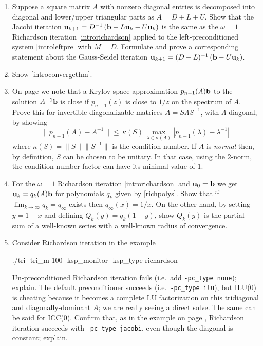 \renewcommand{\labelenumi}{\arabic{chapter}.\arabic{enumi}\quad}
\begin{enumerate}
\item Suppose a square matrix $A$ with nonzero diagonal entries is decomposed into diagonal and lower/upper triangular parts as $A=D+L+U$.  Show that the Jacobi iteration $\mathbf{u}_{k+1} = D^{-1} \left(\mathbf{b} - L \mathbf{u}_k - U \mathbf{u}_k\right)$ is the same as the $\omega=1$ Richardson iteration \eqref{introrichardson} applied to the left-preconditioned system \eqref{introleftpre} with $M=D$.  Formulate and prove a corresponding statement about the Gauss-Seidel iteration $\mathbf{u}_{k+1} = (D+L)^{-1} \left(\mathbf{b} - U \mathbf{u}_k\right)$.

\item Show \eqref{introconvergethm}.

\item On page \pageref{krylovgoal} we note that a Krylov space approximation $p_{n-1}(A)\mathbf{b}$ to the solution $A^{-1}\mathbf{b}$ is close if $p_{n-1}(z)$ is close to $1/z$ on the spectrum of $A$.  Prove this for invertible diagonalizable matrices $A=S\Lambda S^{-1}$, with $\Lambda$ diagonal, by showing
	$$\|p_{n-1}(A) - A^{-1}\| \le \,\kappa(S)\, \max_{\lambda \in \sigma(A)} |p_{n-1}(\lambda) - \lambda^{-1}|$$
where $\kappa(S) = \|S\| \|S^{-1}\|$ is the condition number.  If $A$ is \emph{normal} then, by definition, $S$ can be chosen to be unitary.  In that case, using the $2$-norm, the condition number factor can have its minimal value of $1$.

\item For the $\omega=1$ Richardson iteration \eqref{introrichardson} and $\mathbf{u}_0=\mathbf{b}$ we get $\mathbf{u}_k = q_k(A) \mathbf{b}$ for polynomials $q_k$ given by \eqref{richpolys}.  Show that if $\lim_{k\to\infty} q_k=q_\infty$ exists then $q_\infty(x)=1/x$.  On the other hand, by setting $y=1-x$ and defining $Q_k(y)=q_k(1-y)$, show $Q_k(y)$ is the partial sum of a well-known series with a well-known radius of convergence.

\item Consider Richardson iteration in the example
\begin{cline}
./tri -tri_m 100 -ksp_monitor -ksp_type richardson
\end{cline}
Un-preconditioned Richardson iteration fails (i.e.~add \texttt{-pc\_type none}); explain.  The default preconditioner succeeds (i.e.~\texttt{-pc\_type ilu}), but ILU($0$) is cheating because it becomes a complete LU factorization on this tridiagonal and diagonally-dominant $A$; we are really seeing a direct solve.  The same can be said for ICC($0$).  Confirm that, as in the example on page \pageref{introprerichardson}, Richardson iteration succeeds with \texttt{-pc\_type jacobi}, even though the diagonal is constant; explain.


\end{enumerate}
